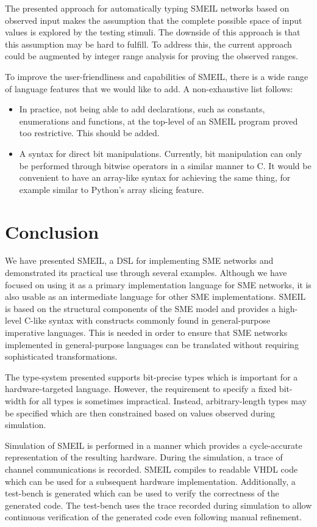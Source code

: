 The presented approach for automatically typing SMEIL networks based on observed
input makes the assumption that the complete possible space of input values is
explored by the testing stimuli. The downside of this approach is that this
assumption may be hard to fulfill. To address this, the current approach could
be augmented by integer range analysis for proving the observed ranges.

To improve the user-friendliness and capabilities of SMEIL, there is a wide
range of language features that we would like to add. A non-exhaustive list
follows:
\begin{itemize}
  \item In practice, not being able to add declarations, such as constants,
    enumerations and functions, at the top-level of an SMEIL program proved too
    restrictive. This should be added.
  \item A syntax for direct bit manipulations. Currently, bit manipulation can
    only be performed through bitwise operators in a similar manner to C. It
    would be convenient to have an array-like syntax for achieving the same
    thing, for example similar to Python's array slicing feature.
\end{itemize}

\section*{Conclusion}
We have presented SMEIL, a DSL for implementing SME networks and demonstrated
its practical use through several examples. Although we have focused on using it
as a primary implementation language for SME networks, it is also usable as an
intermediate language for other SME implementations. SMEIL is based on the
structural components of the SME model and provides a high-level C-like syntax
with constructs commonly found in general-purpose imperative languages. This is
needed in order to ensure that SME networks implemented in general-purpose
languages can be translated without requiring sophisticated transformations.

The type-system presented supports bit-precise types which is important for a
hardware-targeted language. However, the requirement to specify a fixed
bit-width for all types is sometimes impractical. Instead, arbitrary-length
types may be specified which are then constrained based on values observed
during simulation.

Simulation of SMEIL is performed in a manner which provides a cycle-accurate
representation of the resulting hardware. During the simulation, a trace of
channel communications is recorded. SMEIL compiles to readable VHDL code which
can be used for a subsequent hardware implementation. Additionally, a test-bench
is generated which can be used to verify the correctness of the generated
code. The test-bench uses the trace recorded during simulation to allow
continuous verification of the generated code even following manual refinement.

